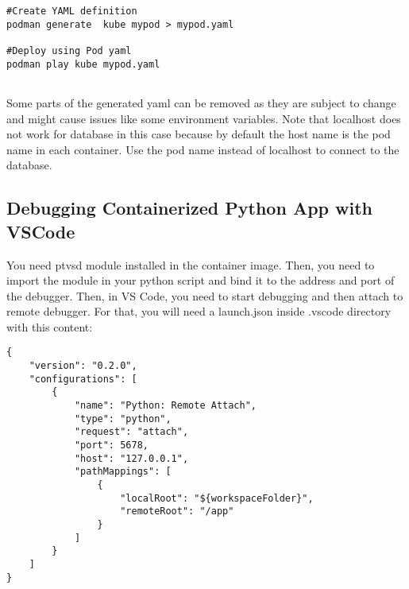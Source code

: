 \documentclass{article}
\begin{document}
\begin{verbatim}
#Create YAML definition
podman generate  kube mypod > mypod.yaml

#Deploy using Pod yaml
podman play kube mypod.yaml


\end{verbatim}

Some parts of the generated yaml can be removed as they are subject to change and might cause issues like some environment variables. 
Note that localhost does not work for database in this case because by default the host name is the pod name in each container. Use the pod name instead of localhost to connect to the database. 

\subsection{Debugging Containerized Python App with VSCode}
You need ptvsd module installed in the container image. Then, you need to import the module in your python script and bind it to the address and port of the debugger. Then, in VS Code, you need to start debugging and then attach to remote debugger. For that, you will need a launch.json inside .vscode directory with this content:  

\begin{lstlisting}
{
    "version": "0.2.0",
    "configurations": [
        {
            "name": "Python: Remote Attach",
            "type": "python",
            "request": "attach",
            "port": 5678,
            "host": "127.0.0.1",
            "pathMappings": [
                {
                    "localRoot": "${workspaceFolder}",
                    "remoteRoot": "/app"
                }
            ]
        }
    ]
}
\end{lstlisting}
\end{document}

